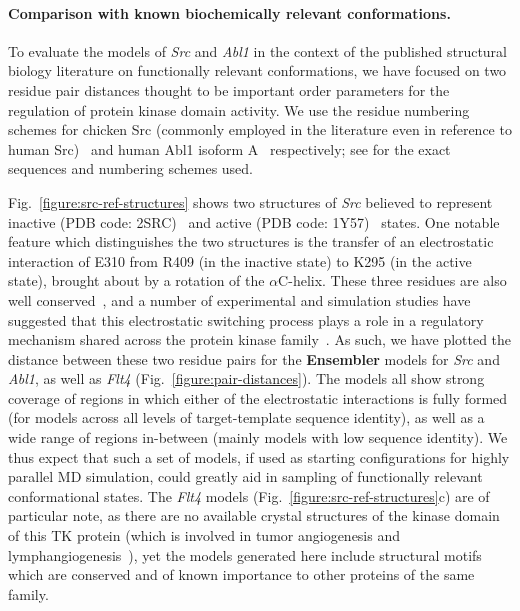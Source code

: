\documentclass[10pt,letterpaper]{article}
\begin{document}
\paragraph{Comparison with known biochemically relevant conformations.}
To evaluate the models of \emph{Src} and \emph{Abl1} in the context of the published structural biology literature on functionally relevant conformations, we have focused on two residue pair distances thought to be important order parameters for the regulation of protein kinase domain activity.
We use the residue numbering schemes for chicken Src (commonly employed in the literature even in reference to human Src)~\cite{xu:1999:2src, cowan-jacob:2005:1y57} and human Abl1 isoform A~\cite{young:2006:2f4j, cowan-jacob:2006:2hyy, levinson:2006:2g1t} respectively; see  for the exact sequences and numbering schemes used.

Fig.~\ref{figure:src-ref-structures} shows two structures of \emph{Src} believed to represent inactive (PDB code: 2SRC)~\cite{xu:1999:2src} and active (PDB code: 1Y57)~\cite{cowan-jacob:2005:1y57} states.
One notable feature which distinguishes the two structures is the transfer of an electrostatic interaction of E310 from R409 (in the inactive state) to K295 (in the active state), brought about by a rotation of the $\alpha$C-helix.
These three residues are also well conserved~\cite{kannan:jmb:2005:kinase-regulation}, and a number of experimental and simulation studies have suggested that this electrostatic switching process plays a role in a regulatory mechanism shared across the protein kinase family~\cite{shukla-pande:nature-commun:2014:src-activation-msm, foda:nat-comm:2015:src, ozkirimli:prot-sci:2008:src}.
As such, we have plotted the distance between these two residue pairs for the {\bf Ensembler} models for \emph{Src} and \emph{Abl1}, as well as \emph{Flt4} (Fig.~\ref{figure:pair-distances}).
The models all show strong coverage of regions in which either of the electrostatic interactions is fully formed (for models across all levels of target-template sequence identity), as well as a wide range of regions in-between (mainly models with low sequence identity).
We thus expect that such a set of models, if used as starting configurations for highly parallel MD simulation, could greatly aid in sampling of functionally relevant conformational states.
The \emph{Flt4} models (Fig.~\ref{figure:src-ref-structures}c) are of particular note, as there are no available crystal structures of the kinase domain of this TK protein (which is involved in tumor angiogenesis and lymphangiogenesis~\cite{Su:2006:flt4cancer}), yet the models generated here include structural motifs which are conserved and of known importance to other proteins of the same family.
\end{document}
